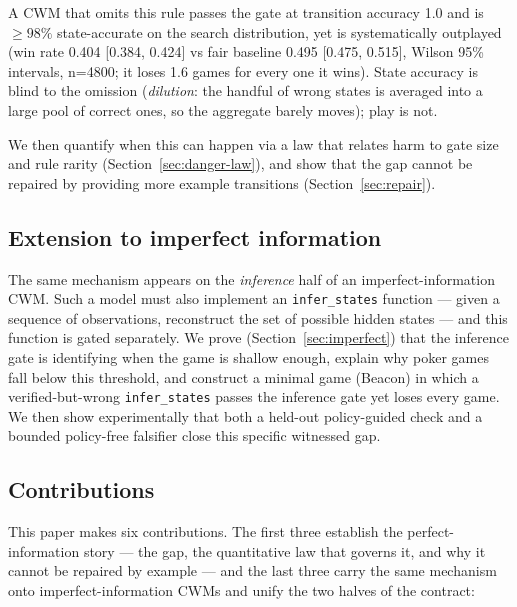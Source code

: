 \documentclass[11pt]{article}
\theoremstyle{remark}
\begin{document}
A CWM that omits this rule passes the gate at transition accuracy 1.0 and is $\geq 98\%$ state-accurate on the search distribution, yet is systematically outplayed (win rate 0.404 [0.384, 0.424] vs fair baseline 0.495 [0.475, 0.515], Wilson 95\% intervals, n=4800; it loses 1.6 games for every one it wins). State accuracy is blind to the omission (\emph{dilution}: the handful of wrong states is averaged into a large pool of correct ones, so the aggregate barely moves); play is not.

We then quantify when this can happen via a law that relates harm to gate size and rule rarity (Section~\ref{sec:danger-law}), and show that the gap cannot be repaired by providing more example transitions (Section~\ref{sec:repair}).

\subsection{Extension to imperfect information}

The same mechanism appears on the \emph{inference} half of an imperfect-information CWM. Such a model must also implement an \texttt{infer\_states} function --- given a sequence of observations, reconstruct the set of possible hidden states --- and this function is gated separately. We prove (Section~\ref{sec:imperfect}) that the inference gate is identifying when the game is shallow enough, explain why poker games fall below this threshold, and construct a minimal game (Beacon) in which a verified-but-wrong \texttt{infer\_states} passes the inference gate yet loses every game. We then show experimentally that both a held-out policy-guided check and a bounded policy-free falsifier close this specific witnessed gap.

\subsection{Contributions}

This paper makes six contributions. The first three establish the perfect-information story --- the gap, the quantitative law that governs it, and why it cannot be repaired by example --- and the last three carry the same mechanism onto imperfect-information CWMs and unify the two halves of the contract:
\end{document}
